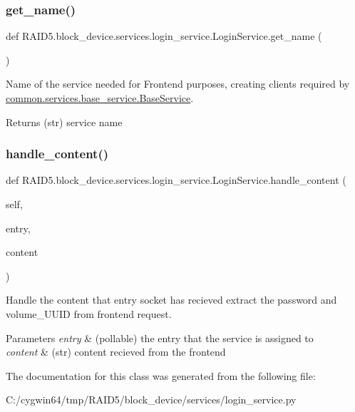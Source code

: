 \subsubsection{\texorpdfstring{get\+\_\+name()}{get\_name()}}
{\footnotesize\ttfamily def R\+A\+I\+D5.\+block\+\_\+device.\+services.\+login\+\_\+service.\+Login\+Service.\+get\+\_\+name (\begin{DoxyParamCaption}{ }\end{DoxyParamCaption})\hspace{0.3cm}{\ttfamily [static]}}



Name of the service needed for Frontend purposes, creating clients required by \hyperlink{class_r_a_i_d5_1_1common_1_1services_1_1base__service_1_1_base_service}{common.\+services.\+base\+\_\+service.\+Base\+Service}. 

\begin{DoxyReturn}{Returns}
(str) service name 
\end{DoxyReturn}
\mbox{\label{class_r_a_i_d5_1_1block__device_1_1services_1_1login__service_1_1_login_service_a0dbcb210b5b1bbd67a0321b86c21824f}} 
\subsubsection{\texorpdfstring{handle\+\_\+content()}{handle\_content()}}
{\footnotesize\ttfamily def R\+A\+I\+D5.\+block\+\_\+device.\+services.\+login\+\_\+service.\+Login\+Service.\+handle\+\_\+content (\begin{DoxyParamCaption}\item[{}]{self,  }\item[{}]{entry,  }\item[{}]{content }\end{DoxyParamCaption})}



Handle the content that entry socket has recieved extract the password and volume\+\_\+\+U\+U\+ID from frontend request. 


\begin{DoxyParams}{Parameters}
{\em entry} & (pollable) the entry that the service is assigned to \\
\hline
{\em content} & (str) content recieved from the frontend \\
\hline
\end{DoxyParams}


The documentation for this class was generated from the following file\+:\begin{DoxyCompactItemize}
\item 
C\+:/cygwin64/tmp/\+R\+A\+I\+D5/block\+\_\+device/services/login\+\_\+service.\+py\end{DoxyCompactItemize}
